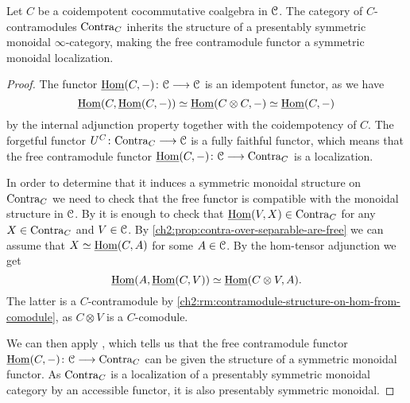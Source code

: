 \begin{lemma}
    \label{ch2:lm:free-contra-monoidal}
    Let $C$ be a coidempotent cocommutative coalgebra in $\EuScript{C}$. The category of $C$-contramodules $\mathrm{Contra}_C$ inherits the structure of a presentably symmetric monoidal $\infty$-category, making the free contramodule functor a symmetric monoidal localization.
\end{lemma}
\begin{proof}
    The functor $\operatorname{\underline{Hom}}(C,-)\colon \EuScript{C} \longrightarrow \EuScript{C}$ is an idempotent functor, as we have
    \[\operatorname{\underline{Hom}}(C, \operatorname{\underline{Hom}}(C,-))\simeq \operatorname{\underline{Hom}}(C\otimes C, -)\simeq \operatorname{\underline{Hom}}(C,-)\]
    by the internal adjunction property together with the coidempotency of $C$. The forgetful functor $U^C\colon \mathrm{Contra}_C\longrightarrow \EuScript{C}$ is a fully faithful functor, which means that the free contramodule functor $\operatorname{\underline{Hom}}(C,-)\colon\EuScript{C}\longrightarrow \mathrm{Contra}_C$ is a localization. 
    
    In order to determine that it induces a symmetric monoidal structure on $\mathrm{Contra}_C$ we need to check that the free functor is compatible with the monoidal structure in $\EuScript{C}$. By \cite[2.12(3)]{nikolaus_2016} it is enough to check that $\operatorname{\underline{Hom}}(V,X)\in \mathrm{Contra}_C$ for any $X\in \mathrm{Contra}_C$ and $V\in \EuScript{C}$. By \cref{ch2:prop:contra-over-separable-are-free} we can assume that $X \simeq \operatorname{\underline{Hom}}(C, A)$ for some $A\in \EuScript{C}$. By the hom-tensor adjunction we get 
    \[\operatorname{\underline{Hom}}(A, \operatorname{\underline{Hom}}(C, V))\simeq \operatorname{\underline{Hom}}(C\otimes V, A).\]
    The latter is a $C$-contramodule by \cref{ch2:rm:contramodule-structure-on-hom-from-comodule}, as $C\otimes V$ is a $C$-comodule. 

    We can then apply \cite[2.2.1.9]{lurie_09}, which tells us that the free contramodule functor $\operatorname{\underline{Hom}}(C,-)\colon \EuScript{C}\longrightarrow \mathrm{Contra}_C$ can be given the structure of a symmetric monoidal functor. As $\mathrm{Contra}_C$ is a localization of a presentably symmetric monoidal category by an accessible functor, it is also presentably symmetric monoidal.  
\end{proof}





